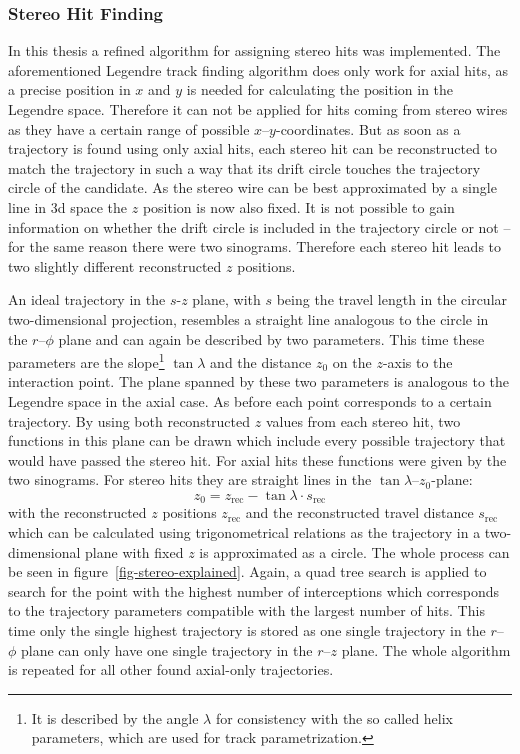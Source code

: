 \subsubsection{Stereo Hit Finding}

In this thesis a refined algorithm for assigning stereo hits was implemented. The aforementioned Legendre track finding algorithm does only work for axial hits, as a precise position in $x$ and $y$ is needed for calculating the position in the Legendre space. Therefore it can not be applied for hits coming from stereo wires as they have a certain range of possible $x$--$y$-coordinates. But as soon as a trajectory is found using only axial hits, each stereo hit can be reconstructed to match the trajectory in such a way that its drift circle touches the trajectory circle of the candidate. As the stereo wire can be best approximated by a single line in 3d space the $z$ position is now also fixed. It is not possible to gain information on whether the drift circle is included in the trajectory circle or not -- for the same reason there were two sinograms. Therefore each stereo hit leads to two slightly different reconstructed $z$ positions. 

An ideal trajectory in the $s$-$z$ plane, with $s$ being the travel length in the circular two-dimensional projection, resembles a straight line analogous to the circle in the $r$--$\phi$ plane and can again be described by two parameters. This time these parameters are the slope\footnote{It is described by the angle $\lambda$ for consistency with the so called helix parameters, which are used for track parametrization.} $\tan \lambda$ and the distance $z_0$ on the $z$-axis to the interaction point. The plane spanned by these two parameters is analogous to the Legendre space in the axial case. As before each point corresponds to a certain trajectory. By using both reconstructed $z$ values from each stereo hit, two functions in this plane can be drawn which include every possible trajectory that would have passed the stereo hit. For axial hits these functions were given by the two sinograms. For stereo hits they are straight lines in the $\tan \lambda$--$z_0$-plane:
$$ z_0 = z_\text{rec} - \tan \lambda \cdot s_\text{rec} $$
with the reconstructed $z$ positions $z_\text{rec}$ and the reconstructed travel distance $s_\text{rec}$ which can be calculated using trigonometrical relations as the trajectory in a two-dimensional plane with fixed $z$ is approximated as a circle. The whole process can be seen in figure~\ref{fig-stereo-explained}. Again, a quad tree search is applied to search for the point with the highest number of interceptions which corresponds to the trajectory parameters compatible with the largest number of hits. This time only the single highest trajectory is stored as one single trajectory in the $r$--$\phi$ plane can only have one single trajectory in the $r$--$z$ plane. The whole algorithm is repeated for all other found axial-only trajectories. 

